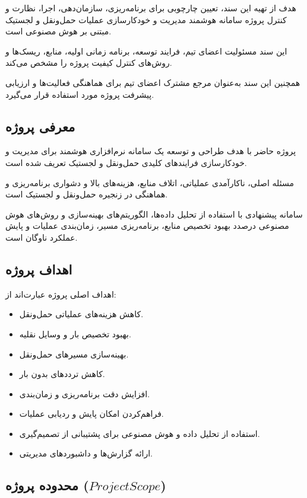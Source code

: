 \documentclass[12pt,a4paper]{article}
\begin{document}
	هدف از تهیه این سند، تعیین چارچوبی برای
	برنامه‌ریزی، سازمان‌دهی، اجرا، نظارت و کنترل
	پروژه سامانه هوشمند مدیریت و خودکارسازی
	عملیات حمل‌ونقل و لجستیک مبتنی بر هوش مصنوعی است.
	
	این سند مسئولیت اعضای تیم، فرایند توسعه،
	برنامه زمانی اولیه، منابع، ریسک‌ها و روش‌های
	کنترل کیفیت پروژه را مشخص می‌کند.
	
	همچنین این سند به‌عنوان مرجع مشترک اعضای تیم
	برای هماهنگی فعالیت‌ها و ارزیابی پیشرفت پروژه
	مورد استفاده قرار می‌گیرد.
	
	\subsection{معرفی پروژه}
	
	پروژه حاضر با هدف طراحی و توسعه یک سامانه
	نرم‌افزاری هوشمند برای مدیریت و خودکارسازی
	فرایندهای کلیدی حمل‌ونقل و لجستیک تعریف شده است.
	
	مسئله اصلی، ناکارآمدی عملیاتی، اتلاف منابع،
	هزینه‌های بالا و دشواری برنامه‌ریزی و هماهنگی
	در زنجیره حمل‌ونقل و لجستیک است.
	
	سامانه پیشنهادی با استفاده از تحلیل داده‌ها،
	الگوریتم‌های بهینه‌سازی و روش‌های هوش مصنوعی
	درصدد بهبود تخصیص منابع، برنامه‌ریزی مسیر،
	زمان‌بندی عملیات و پایش عملکرد ناوگان است.
	
	\subsection{اهداف پروژه}
	
	اهداف اصلی پروژه عبارت‌اند از:
	
	\begin{itemize}
		\item کاهش هزینه‌های عملیاتی حمل‌ونقل.
		\item بهبود تخصیص بار و وسایل نقلیه.
		\item بهینه‌سازی مسیرهای حمل‌ونقل.
		\item کاهش ترددهای بدون بار.
		\item افزایش دقت برنامه‌ریزی و زمان‌بندی.
		\item فراهم‌کردن امکان پایش و ردیابی عملیات.
		\item استفاده از تحلیل داده و هوش مصنوعی
		برای پشتیبانی از تصمیم‌گیری.
		\item ارائه گزارش‌ها و داشبوردهای مدیریتی.
	\end{itemize}
	
	\subsection{محدوده پروژه ($Project Scope$)}
	
\end{document}
